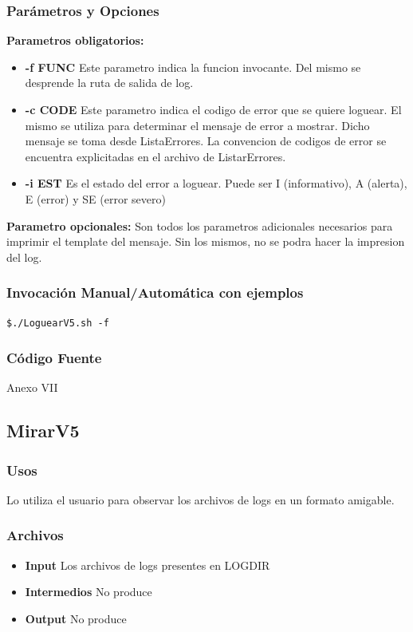 \documentclass[a4paper,10pt,titlepage]{article}
\begin{document}
		\subsubsection{Par\'ametros y Opciones}
{\bf Parametros obligatorios:}
			\begin {itemize}
				\item \textbf{-f FUNC} {Este parametro indica la funcion invocante. Del mismo se desprende la ruta de salida de log.}
				\item \textbf{-c CODE} { Este parametro indica el codigo de error que se quiere loguear. El mismo se utiliza para determinar el mensaje de error a mostrar. Dicho mensaje se toma desde ListaErrores. La convencion de codigos de error se encuentra explicitadas en el archivo de ListarErrores.}
				\item \textbf{-i EST } {Es el estado del error a loguear. Puede ser I (informativo), A (alerta), E (error) y SE (error severo)}
			\end{itemize}

{\bf Parametro opcionales:} Son todos los parametros adicionales necesarios para imprimir el template del mensaje. Sin los mismos, no se podra hacer la impresion del log.
	
		\subsubsection{Invocaci\'on Manual/Autom\'atica con ejemplos}

\begin{verbatim}
$./LoguearV5.sh -f  
\end{verbatim}
		\subsubsection{C\'odigo Fuente}
			Anexo VII


	\subsection{MirarV5}
		\subsubsection{Usos}

Lo utiliza el usuario para observar los archivos de logs en un formato amigable.
			 
		\subsubsection{Archivos}
			\begin {itemize}
				\item \textbf{Input} {Los archivos de logs presentes en LOGDIR}
				\item \textbf{Intermedios} {No produce}
				\item \textbf{Output} {No produce}
			\end{itemize}
\end{document}
